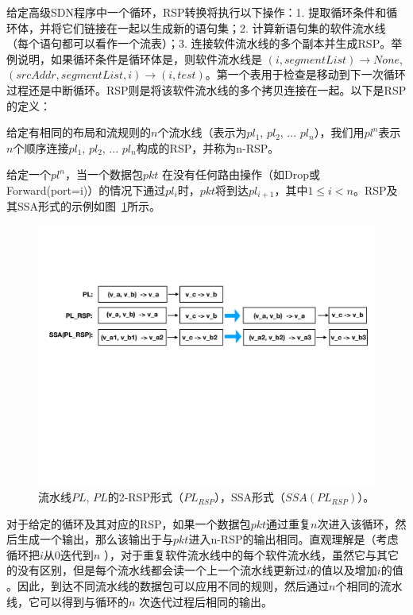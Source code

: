给定高级SDN程序中一个循环，RSP转换将执行以下操作：1. 提取循环条件和循环体，并将它们链接在一起以生成新的语句集；2. 计算新语句集的软件流水线（每个语句都可以看作一个流表）；3. 连接软件流水线的多个副本并生成RSP。举例说明，如果循环条件是循环体是，则软件流水线是 $(i, segmentList) \rightarrow None$, $(srcAddr, segmentList, i) \rightarrow (i, test)$。第一个表用于检查是移动到下一次循环过程还是中断循环。RSP则是将该软件流水线的多个拷贝连接在一起。以下是RSP的定义：

\begin{definition}
给定有相同的布局和流规则的$n$个流水线（表示为$pl_1$, $pl_2$, ... $pl_n$），我们用$pl^n$表示$n$个顺序连接$pl_1$, $pl_2$, ... $pl_n$构成的RSP，并称为n-RSP。
\end{definition}

给定一个$pl^n$，当一个数据包$pkt$ 在没有任何路由操作（如Drop或Forward(port=i)）的情况下通过$pl_i$时，$pkt$将到达$pl_{i+1}$，其中$1 \leq i < n$。RSP及其SSA形式的示例如图~\ref{fig:pipelines}所示。

\begin{figure}[!htbp]
\includegraphics[width=0.93\linewidth]{figures/lp-66.pdf}
\centering
\caption{\small 流水线$PL$, $PL$的2-RSP形式（$PL_{RSP}$），SSA形式（$SSA(PL_{RSP})$）。}
\label{fig:pipelines}
\end{figure}

对于给定的循环及其对应的RSP，如果一个数据包$pkt$通过重复$n$次进入该循环，然后生成一个输出，那么该输出于与$pkt$进入n-RSP的输出相同。直观理解是（考虑循环把$i$从$0$迭代到$n$ ），对于重复软件流水线中的每个软件流水线，虽然它与其它的没有区别，但是每个流水线都会读一个上一个流水线更新过$i$的值以及增加$i$的值 。因此，到达不同流水线的数据包可以应用不同的规则，然后通过$n$个相同的流水线，它可以得到与循环的$n$ 次迭代过程后相同的输出。

